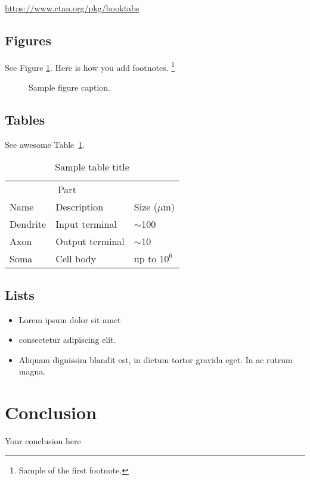 \documentclass{article}
\begin{document}
\begin{center}
  \url{https://www.ctan.org/pkg/booktabs}
\end{center}


\subsection{Figures}
\lipsum[10] 
See Figure \ref{fig:fig1}. Here is how you add footnotes. \footnote{Sample of the first footnote.}
\lipsum[11] 

\begin{figure}
  \centering
  \fbox{\rule[-.5cm]{4cm}{4cm} \rule[-.5cm]{4cm}{0cm}}
  \caption{Sample figure caption.}
  \label{fig:fig1}
\end{figure}

\subsection{Tables}
\lipsum[12]
See awesome Table~\ref{tab:table}.

\begin{table}
 \caption{Sample table title}
  \centering
  \begin{tabular}{lll}
    \toprule
    \multicolumn{2}{c}{Part}                   \\
    \cmidrule(r){1-2}
    Name     & Description     & Size ($\mu$m) \\
    \midrule
    Dendrite & Input terminal  & $\sim$100     \\
    Axon     & Output terminal & $\sim$10      \\
    Soma     & Cell body       & up to $10^6$  \\
    \bottomrule
  \end{tabular}
  \label{tab:table}
\end{table}

\subsection{Lists}
\begin{itemize}
\item Lorem ipsum dolor sit amet
\item consectetur adipiscing elit. 
\item Aliquam dignissim blandit est, in dictum tortor gravida eget. In ac rutrum magna.
\end{itemize}


\section{Conclusion}
Your conclusion here
\end{document}

